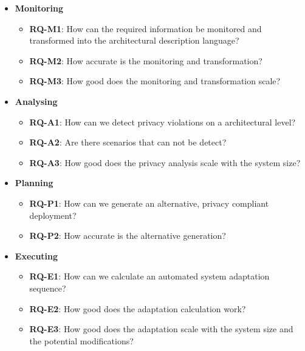 \begin{itemize}
	\setlength\itemsep{0em}
	\item \textbf{Monitoring} %
	\begin{itemize}
		\setlength\itemsep{0em}
		\item \textbf{RQ-M1}: How can the required information be monitored and transformed into the architectural description language?
		\item \textbf{RQ-M2}: How accurate is the monitoring and transformation?
		\item \textbf{RQ-M3}: How good does the monitoring and transformation scale?
	\end{itemize}
		\item \textbf{Analysing} %
	\begin{itemize}
		\setlength\itemsep{0em}
		\item \textbf{RQ-A1}: How can we detect privacy violations on a architectural level?
		\item \textbf{RQ-A2}: Are there scenarios that can not be detect?
		\item \textbf{RQ-A3}: How good does the privacy analysis scale with the system size?
	\end{itemize}

	\item \textbf{Planning} %
	\begin{itemize}
		\setlength\itemsep{0em}
		\item \textbf{RQ-P1}: How can we generate an alternative, privacy compliant deployment?
		\item \textbf{RQ-P2}: How accurate is the alternative generation?
	\end{itemize}

	\item \textbf{Executing} %
	\begin{itemize}
		\setlength\itemsep{0em}
		\item \textbf{RQ-E1}: How can we calculate an automated system adaptation sequence?
		\item \textbf{RQ-E2}: How good does the adaptation calculation work?
		\item \textbf{RQ-E3}: How good does the adaptation scale with the system size and the potential modifications?
	\end{itemize}
\end{itemize}


